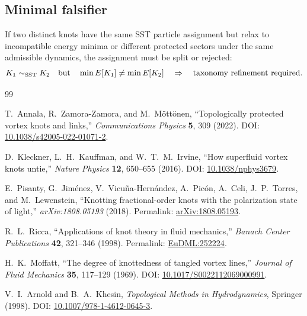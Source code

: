 \subsection{Minimal falsifier}
If two distinct knots have the same SST particle assignment but relax to incompatible energy minima or different protected sectors under the same admissible dynamics, the assignment must be split or rejected:
\begin{equation}
    K_1\sim_{\rm SST}K_2
    \quad\text{but}\quad
    \min E[K_1]\neq \min E[K_2]
    \quad\Rightarrow\quad
    \text{taxonomy refinement required.}
\end{equation}


\begin{thebibliography}{99}

T.~Annala, R.~Zamora-Zamora, and M.~M{\"o}tt{\"o}nen,
``Topologically protected vortex knots and links,''
\emph{Communications Physics} \textbf{5}, 309 (2022).
DOI: \href{https://doi.org/10.1038/s42005-022-01071-2}{10.1038/s42005-022-01071-2}.

D.~Kleckner, L.~H.~Kauffman, and W.~T.~M.~Irvine,
``How superfluid vortex knots untie,''
\emph{Nature Physics} \textbf{12}, 650--655 (2016).
DOI: \href{https://doi.org/10.1038/nphys3679}{10.1038/nphys3679}.

E.~Pisanty, G.~Jim{\'e}nez, V.~Vicu{\~n}a-Hern{\'a}ndez, A.~Pic{\'o}n, A.~Celi, J.~P.~Torres, and M.~Lewenstein,
``Knotting fractional-order knots with the polarization state of light,''
\emph{arXiv:1808.05193} (2018).
Permalink: \href{https://arxiv.org/abs/1808.05193}{arXiv:1808.05193}.

R.~L.~Ricca,
``Applications of knot theory in fluid mechanics,''
\emph{Banach Center Publications} \textbf{42}, 321--346 (1998).
Permalink: \href{https://eudml.org/doc/252224}{EuDML:252224}.

H.~K.~Moffatt,
``The degree of knottedness of tangled vortex lines,''
\emph{Journal of Fluid Mechanics} \textbf{35}, 117--129 (1969).
DOI: \href{https://doi.org/10.1017/S0022112069000991}{10.1017/S0022112069000991}.

V.~I.~Arnold and B.~A.~Khesin,
\emph{Topological Methods in Hydrodynamics},
Springer (1998).
DOI: \href{https://doi.org/10.1007/978-1-4612-0645-3}{10.1007/978-1-4612-0645-3}.

\end{thebibliography}

